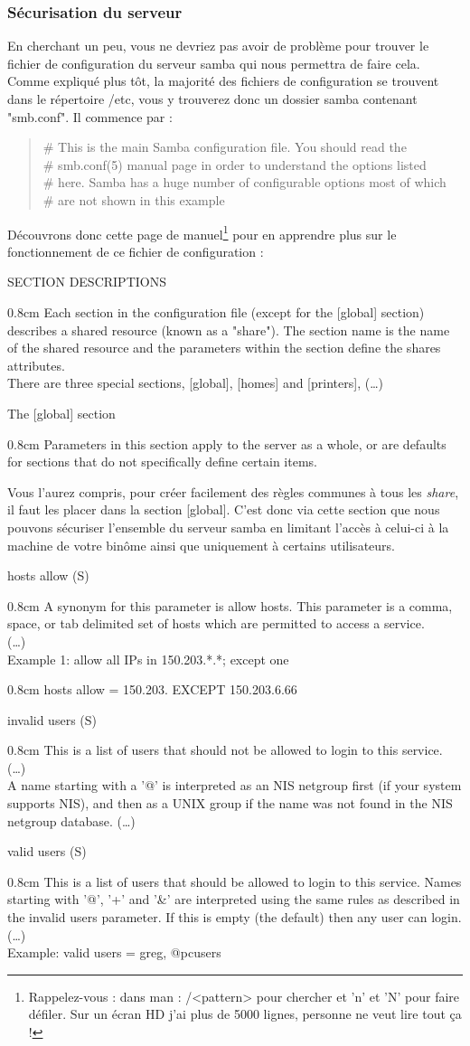 \documentclass[a4paper,11pt]{article}
\newcommand{\commande}[1] {
    \begin{quote}
    \tt\raggedright #1
    \end{quote}
}
\newcommand{\man}[2]{
    \begin{tcolorbox}[toprule=3mm,width=\textwidth,outer arc=0mm,colbacktitle=grayman,coltitle=black,colback={grayman},colframe={grayman},title={man : \tt #1}]
        \tt\raggedright #2
    \end{tcolorbox}
}
\newcommand{\mandesc}[1]{
    \begin{adjustwidth}{0.8cm}{}
        #1
    \end{adjustwidth}
}
\begin{document}
\subsubsection{Sécurisation du serveur}
\par En cherchant un peu, vous ne devriez pas avoir de problème pour trouver le fichier de configuration du serveur samba qui nous permettra de faire cela. Comme expliqué plus tôt, la majorité des fichiers de configuration se trouvent dans le répertoire /etc, vous y trouverez donc un dossier samba contenant "smb.conf". Il commence par :
\commande{\# This is the main Samba configuration file. You should read the\\
\# smb.conf(5) manual page in order to understand the options listed\\
\# here. Samba has a huge number of configurable options most of which\\
\# are not shown in this example}
\par Découvrons donc cette page de manuel\footnote{Rappelez-vous : dans man : /<pattern> pour chercher et 'n' et 'N' pour faire défiler. Sur un écran HD j'ai plus de 5000 lignes, personne ne veut lire tout ça !} pour en apprendre plus sur le fonctionnement de ce fichier de configuration :
\man{smb.conf}{
SECTION DESCRIPTIONS
\mandesc{Each section in the configuration file (except for the [global] section) describes a shared resource (known as a "share"). The section name is the name of the shared resource and the parameters within the section define the shares attributes.\\
There are three special sections, [global], [homes] and [printers], (\dots)}
The [global] section
\mandesc{Parameters in this section apply to the server as a whole, or are defaults for sections that do not specifically define certain items.}
}
\par Vous l'aurez compris, pour créer facilement des règles communes à tous les \emph{share}, il faut les placer dans la section [global]. C'est donc via cette section que nous pouvons sécuriser l'ensemble du serveur samba en limitant l'accès à celui-ci à la machine de votre binôme ainsi que uniquement à certains utilisateurs.
\man{smb.conf}{
hosts allow (S)
\mandesc{A synonym for this parameter is allow hosts. This parameter is a comma, space, or tab delimited set of hosts which are permitted to access a service.\\
(\dots)\\
Example 1: allow all IPs in 150.203.*.*; except one
\mandesc{hosts allow = 150.203. EXCEPT 150.203.6.66}
}
invalid users (S)
\mandesc{This is a list of users that should not be allowed to login to this service. (\dots)\\
A name starting with a '@' is interpreted as an NIS netgroup first (if your system supports NIS), and then as a UNIX group if the name was not found in the NIS netgroup database. (\dots)}
valid users (S)
\mandesc{This is a list of users that should be allowed to login to this service. Names starting with '@', '+' and '\&' are interpreted using the same rules as described in the invalid users parameter. If this is empty (the default) then any user can login. (\dots)\\
Example: valid users = greg, @pcusers}
}
\end{document}
